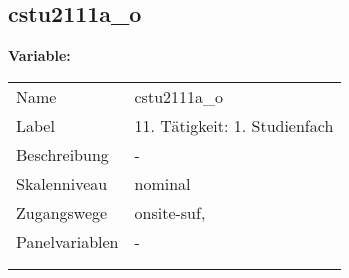 	
	
	\subsection{cstu2111a\_o}
	\label{subSection:cstu2111a_o}

	\noindent\textbf{Variable:}\\
		\begin{tabular}{lL{11.3cm}}
			\label{tableVariable:cstu2111a_o}
			Name & cstu2111a\_o \\
			Label & 11. Tätigkeit: 1. Studienfach \\
			Beschreibung & - \\
			Skalenniveau & nominal \\
			Zugangswege &
				onsite-suf,
 \\
			Panelvariablen & -
			 \\
			 \\
 \\
		\end{tabular}






